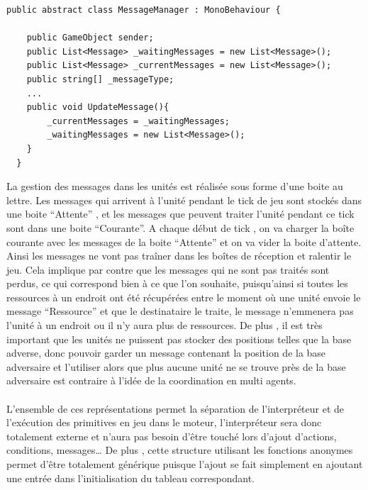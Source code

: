 \documentclass{report}
\begin{document}
\begin{lstlisting}[frame=single]
public abstract class MessageManager : MonoBehaviour {

    public GameObject sender;
    public List<Message> _waitingMessages = new List<Message>();
    public List<Message> _currentMessages = new List<Message>();
    public string[] _messageType;
    ...
    public void UpdateMessage(){
        _currentMessages = _waitingMessages;
        _waitingMessages = new List<Message>();
    }
  }    
\end{lstlisting}

La gestion des messages dans les unités est réalisée sous forme d’une boite au lettre. Les messages qui arrivent à l’unité pendant le tick  de jeu sont stockés dans une boite “Attente” , et les messages que peuvent traiter l’unité pendant ce tick sont dans une boite “Courante”. A chaque début de tick , on va charger la boîte courante avec les messages de la boite “Attente” et on va vider la boite d’attente. Ainsi les messages ne vont pas traîner dans les boîtes de réception et ralentir le jeu. Cela implique par contre que les messages qui ne sont pas traités sont perdus, ce qui correspond bien à ce que l’on souhaite, puisqu’ainsi si toutes les ressources à un endroit ont été récupérées entre le moment où une unité envoie le message “Ressource” et que le destinataire le traite, le message n’emmenera pas l’unité à un endroit ou il n’y aura plus de ressources. De plus , il est très important que les unités ne puissent pas stocker des positions telles que la base adverse, donc pouvoir garder un message contenant la position de la base adversaire et l’utiliser alors que plus aucune unité ne se trouve près de la base adversaire est contraire à l’idée de la coordination en multi agents.
\paragraph{}

L’ensemble de ces représentations permet la séparation de l’interpréteur et de l'exécution des primitives en jeu dans le moteur, l’interpréteur sera donc totalement externe et n’aura pas besoin d’être touché lors d’ajout d’actions, conditions, messages…
De plus , cette structure utilisant les fonctions anonymes permet d'être totalement générique puisque l’ajout se fait simplement en ajoutant une entrée dans l’initialisation du tableau correspondant.
\paragraph{}
\end{document}
